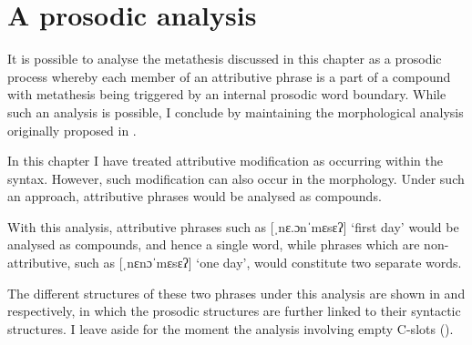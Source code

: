 \section{A prosodic analysis}\label{sec:ProsMet}
It is possible to analyse the metathesis discussed in this chapter
as a prosodic process whereby each member
of an attributive phrase is a part of a compound
with metathesis being triggered by an internal prosodic word boundary.
While such an analysis is possible, I conclude by maintaining
the morphological analysis originally proposed in .

In this chapter I have treated attributive modification as occurring within the syntax.
However, such modification can also occur in the morphology.
Under such an approach, attributive phrases would be analysed as compounds.

With this analysis, attributive phrases
such as  [ˌnɛ.ɔnˈmɛsɛʔ] `first day'
would be analysed as compounds, and hence a single word,
while phrases which are non-attributive,
such as  [ˌnɛnɔˈmɛsɛʔ] `one day',
would constitute two separate words.

The different structures of these two phrases under
this analysis are shown in 
and  respectively,
in which the prosodic structures are further
linked to their syntactic structures.
I leave aside for the moment the analysis
involving empty C-slots ().

